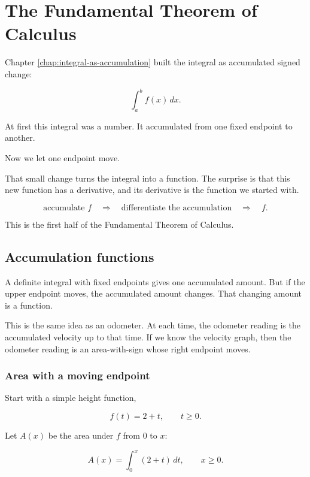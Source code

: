 
\chapter{The Fundamental Theorem of Calculus}
\label{chap:fundamental-theorem-calculus}

Chapter \ref{chap:integral-as-accumulation} built the integral as accumulated signed
change:

\[
\int_a^b f(x)\,dx.
\]

At first this integral was a number.  It accumulated from one fixed endpoint to another.

Now we let one endpoint move.

That small change turns the integral into a function.  The surprise is that this new
function has a derivative, and its derivative is the function we started with.

\[
\text{accumulate } f
\quad\Longrightarrow\quad
\text{differentiate the accumulation}
\quad\Longrightarrow\quad
f.
\]

This is the first half of the Fundamental Theorem of Calculus.

\section{Accumulation functions}
\label{sec:accumulation-functions}

A definite integral with fixed endpoints gives one accumulated amount.  But if the upper
endpoint moves, the accumulated amount changes.  That changing amount is a function.

This is the same idea as an odometer.  At each time, the odometer reading is the
accumulated velocity up to that time.  If we know the velocity graph, then the odometer
reading is an area-with-sign whose right endpoint moves.

\subsection{Area with a moving endpoint}
\label{subsec:area-moving-endpoint}

Start with a simple height function,

\[
f(t)=2+t,
\qquad t\ge 0.
\]

Let \(A(x)\) be the area under \(f\) from \(0\) to \(x\):

\[
A(x)=\int_0^x (2+t)\,dt,
\qquad x\ge 0.
\]


